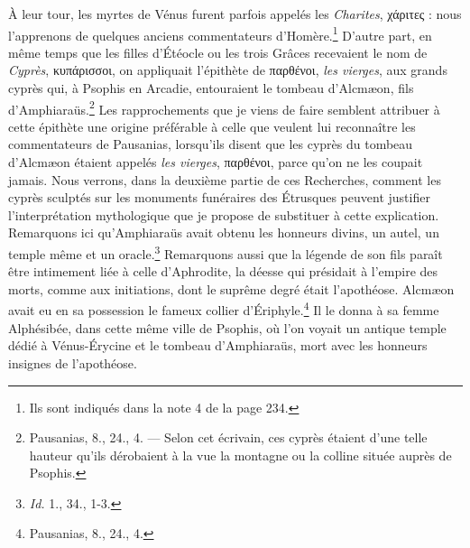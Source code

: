 \documentclass{article}
\begin{document}
À leur tour, les myrtes de Vénus furent parfois appelés les \emph{Charites}, \textgreek{χάριτες} : nous l'apprenons de quelques anciens commentateurs d'Homère.\footnote{Ils sont indiqués dans la note 4 de la page 234.} D'autre part, en même temps que les filles d'Étéocle ou les trois Grâces recevaient le nom de \emph{Cyprès}, \textgreek{κυπάρισσοι}, on appliquait l'épithète de \textgreek{παρθένοι}, \emph{les vierges}, aux grands cyprès qui, à Psophis en Arcadie, entouraient le tombeau d'Alcmæon, fils d'Amphiaraüs.\footnote{Pausanias, 8., 24., 4. --- Selon cet écrivain, ces cyprès étaient d'une telle hauteur qu'ils dérobaient à la vue la montagne ou la colline située auprès de Psophis.} Les rapprochements que je viens de faire semblent attribuer à cette épithète une origine préférable à celle que veulent lui reconnaître les commentateurs de Pausanias, lorsqu'ils disent que les cyprès du tombeau d'Alcmæon étaient appelés \emph{les vierges}, \textgreek{παρθένοι}, parce qu'on ne les coupait jamais. Nous verrons, dans la deuxième partie de ces Recherches, comment les cyprès sculptés sur les monuments funéraires des Étrusques peuvent justifier l'interprétation mythologique que je propose de substituer à cette explication. Remarquons ici qu'Amphiaraüs avait obtenu les honneurs divins, un autel, un temple même et un oracle.\footnote{\emph{Id.} 1., 34., 1-3.} Remarquons aussi que la légende de son fils paraît être intimement liée à celle d'Aphrodite, la déesse qui présidait à l'empire des morts, comme aux initiations, dont le suprême degré était l'apothéose. Alcmæon avait eu en sa possession le fameux collier d'Ériphyle.\footnote{Pausanias, 8., 24., 4.} Il le donna à sa femme Alphésibée, dans cette même ville de Psophis, où l'on voyait un antique temple dédié à Vénus-Érycine et le tombeau d'Amphiaraüs, mort avec les honneurs insignes de l'apothéose.
\end{document}
